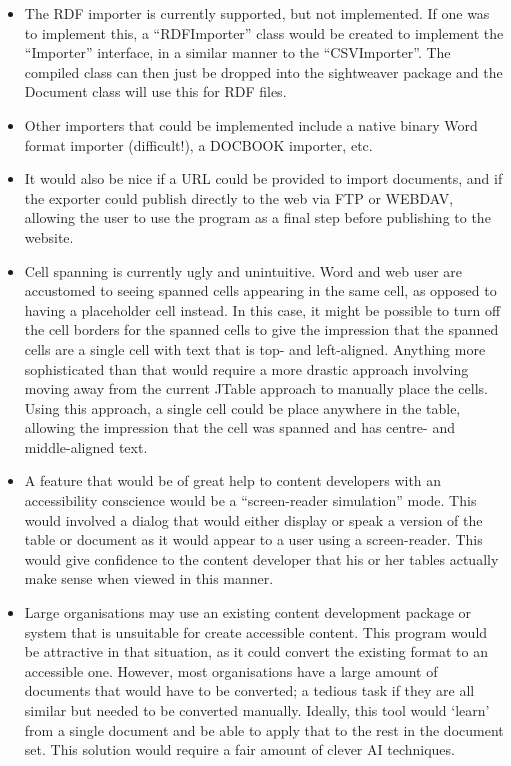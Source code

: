 \begin{itemize}

\item The RDF importer is currently supported, but not implemented. If one was
to implement this, a ``RDFImporter'' class would be created to implement the
``Importer'' interface, in a similar manner to the ``CSVImporter''. The
compiled class can then just be dropped into the sightweaver package and the
Document class will use this for RDF files.

\item Other importers that could be implemented include a native binary Word
format importer (difficult!), a DOCBOOK importer, etc. 

\item It would also be nice if a URL could be provided to import documents, and
if the exporter could publish directly to the web via FTP or WEBDAV, allowing
the user to use the program as a final step before publishing to the website.

\item Cell spanning is currently ugly and unintuitive. Word and web user are 
accustomed to seeing spanned cells appearing in the same cell, as opposed
to having a placeholder cell instead. In this case, it might be possible
to turn off the cell borders for the spanned cells to give the impression
that the spanned cells are a single cell with text that is top- and left-aligned.
Anything more sophisticated than that would require a more drastic approach
involving moving away from the current JTable approach to manually place the
cells. Using this approach, a single cell could be place anywhere in the
table, allowing the impression that the cell was spanned and has centre- and
middle-aligned text.

\item A feature that would be of great help to content developers with an
accessibility conscience would be a ``screen-reader simulation'' mode. This
would involved a dialog that would either display or speak a version of the
table or document as it would appear to a user using a screen-reader. This
would give confidence to the content developer that his or her tables
actually make sense when viewed in this manner.

\item Large organisations may use an existing content development package or
system that is unsuitable for create accessible content. This program would be
attractive in that situation, as it could convert the existing format to an
accessible one. However, most organisations have a large amount of documents
that would have to be converted; a tedious task if they are all similar but
needed to be converted manually. Ideally, this tool would `learn' from a single
document and be able to apply that to the rest in the document set. This solution
would require a fair amount of clever AI techniques.

\end{itemize}

